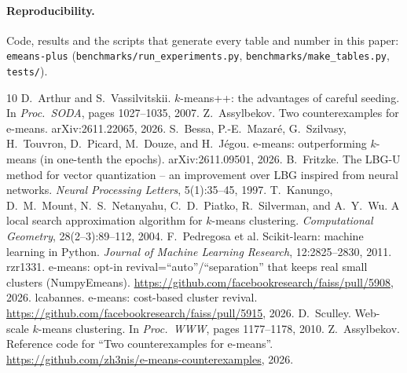 \documentclass[11pt]{article}
\theoremstyle{remark}
\begin{document}
\paragraph{Reproducibility.} Code, results and the scripts that generate every table and number in
this paper: \texttt{emeans-plus} (\texttt{benchmarks/run\_experiments.py},
\texttt{benchmarks/make\_tables.py}, \texttt{tests/}).

\begin{thebibliography}{10}
 D.~Arthur and S.~Vassilvitskii. $k$-means++: the advantages of careful seeding.
  In \emph{Proc.\ SODA}, pages 1027--1035, 2007.
 Z.~Assylbekov. Two counterexamples for e-means. arXiv:2611.22065, 2026.
 S.~Bessa, P.-E.~Mazar\'e, G.~Szilvasy, H.~Touvron, D.~Picard, M.~Douze, and H.~J\'egou.
  e-means: outperforming $k$-means (in one-tenth the epochs). arXiv:2611.09501, 2026.
 B.~Fritzke. The LBG-U method for vector quantization -- an improvement over LBG
  inspired from neural networks. \emph{Neural Processing Letters}, 5(1):35--45, 1997.
 T.~Kanungo, D.~M.~Mount, N.~S.~Netanyahu, C.~D.~Piatko, R.~Silverman, and A.~Y.~Wu.
  A local search approximation algorithm for $k$-means clustering. \emph{Computational Geometry},
  28(2--3):89--112, 2004.
 F.~Pedregosa et al. Scikit-learn: machine learning in Python.
  \emph{Journal of Machine Learning Research}, 12:2825--2830, 2011.
 rzr1331. e-means: opt-in revival=``auto''/``separation'' that keeps real small
  clusters (NumpyEmeans). \url{https://github.com/facebookresearch/faiss/pull/5908}, 2026.
 lcabannes. e-means: cost-based cluster revival.
  \url{https://github.com/facebookresearch/faiss/pull/5915}, 2026.
 D.~Sculley. Web-scale $k$-means clustering. In \emph{Proc.\ WWW}, pages 1177--1178, 2010.
 Z.~Assylbekov. Reference code for ``Two counterexamples for e-means''.
  \url{https://github.com/zh3nis/e-means-counterexamples}, 2026.
\end{thebibliography}
\end{document}
